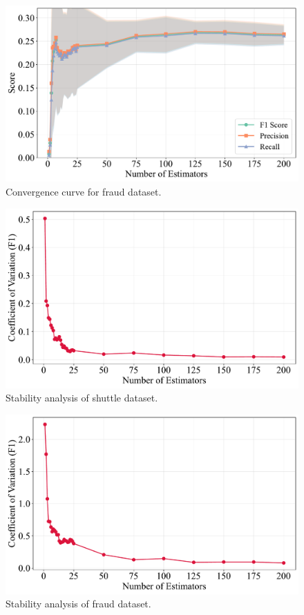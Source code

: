 \documentclass[10pt, conference]{IEEEtran}
\begin{document}
\begin{figure}[H]
	\centering
	\includegraphics[width=\linewidth]{../results/fraud/n_estimators/convergence_curve.pdf}
	\caption{Convergence curve for fraud dataset.}
	\label{fig:n_estimators_fraud}
\end{figure}


\begin{figure}[H]
	\centering
	\includegraphics[width=\linewidth]{../results/shuttle/n_estimators/stability_analysis.pdf}
	\caption{Stability analysis of shuttle dataset.}
	\label{fig:n_estimators_var_shuttle}
\end{figure}
\begin{figure}[H]
	\centering
	\includegraphics[width=\linewidth]{../results/fraud/n_estimators/stability_analysis.pdf}
	\caption{Stability analysis of fraud dataset.}
	\label{fig:n_estimators_var_fraud}
\end{figure}
\end{document}
